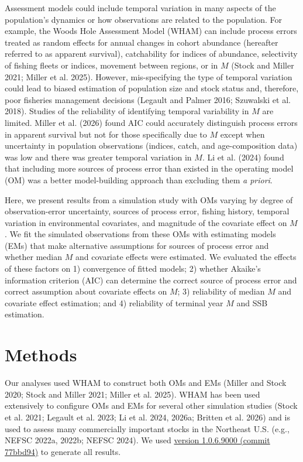 \documentclass[
  12pt,
]{article}
\begin{document}
Assessment models could include temporal variation in many aspects of
the population's dynamics or how observations are related to the
population. For example, the Woods Hole Assessment Model (WHAM) can
include process errors treated as random effects for annual changes in
cohort abundance (hereafter referred to as apparent survival),
catchability for indices of abundance, selectivity of fishing fleets or
indices, movement between regions, or in \(M\) (Stock and Miller 2021;
Miller et al. 2025). However, mis-specifying the type of temporal
variation could lead to biased estimation of population size and stock
status and, therefore, poor fisheries management decisions (Legault and
Palmer 2016; Szuwalski et al. 2018). Studies of the reliability of
identifying temporal variability in \(M\) are limited. Miller et al.
(2026) found AIC could accurately distinguish process errors in apparent
survival but not for those specifically due to \(M\) except when
uncertainty in population observations (indices, catch, and
age-composition data) was low and there was greater temporal variation
in \(M\). Li et al. (2024) found that including more sources of process
error than existed in the operating model (OM) was a better
model-building approach than excluding them \textit{a priori}.

Here, we present results from a simulation study with OMs varying by
degree of observation-error uncertainty, sources of process error,
fishing history, temporal variation in environmental covariates, and
magnitude of the covariate effect on \(M\). We fit the simulated
observations from these OMs with estimating models (EMs) that make
alternative assumptions for sources of process error and whether median
\(M\) and covariate effects were estimated. We evaluated the effects of
these factors on 1) convergence of fitted models; 2) whether Akaike's
information criterion (AIC) can determine the correct source of process
error and correct assumption about covariate effects on \(M\); 3)
reliability of median \(M\) and covariate effect estimation; and 4)
reliability of terminal year \(M\) and SSB estimation.

\section*{Methods}\label{methods}

Our analyses used WHAM to construct both OMs and EMs (Miller and Stock
2020; Stock and Miller 2021; Miller et al. 2025). WHAM has been used
extensively to configure OMs and EMs for several other simulation
studies (Stock et al. 2021; Legault et al. 2023; Li et al. 2024, 2026a;
Britten et al. 2026) and is used to assess many commercially important
stocks in the Northeast U.S. (e.g., NEFSC 2022a, 2022b; NEFSC 2024). We
used
\href{https://github.com/timjmiller/wham/tree/77bbd946e4881216a439933473d1c58b21c270c3}{version
1.0.6.9000 (commit 77bbd94)} to generate all results.
\end{document}
